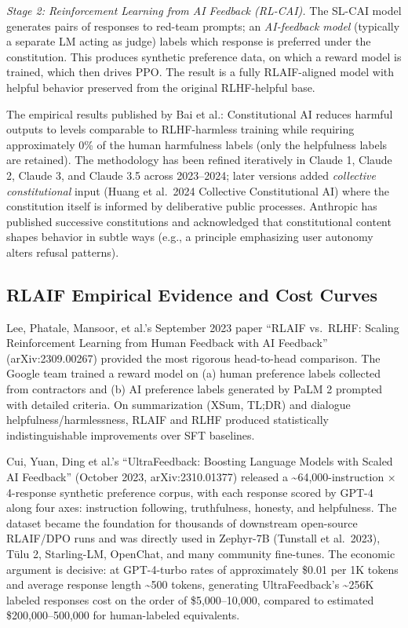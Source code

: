 \documentclass{article}
\begin{document}
\emph{Stage 2: Reinforcement Learning from AI Feedback (RL-CAI).} The SL-CAI model generates pairs of responses to red-team prompts; an \emph{AI-feedback model} (typically a separate LM acting as judge) labels which response is preferred under the constitution. This produces synthetic preference data, on which a reward model is trained, which then drives PPO. The result is a fully RLAIF-aligned model with helpful behavior preserved from the original RLHF-helpful base.

The empirical results published by Bai et al.: Constitutional AI reduces harmful outputs to levels comparable to RLHF-harmless training while requiring approximately 0\% of the human harmfulness labels (only the helpfulness labels are retained). The methodology has been refined iteratively in Claude 1, Claude 2, Claude 3, and Claude 3.5 across 2023--2024; later versions added \emph{collective constitutional} input (Huang et al.~2024 Collective Constitutional AI) where the constitution itself is informed by deliberative public processes. Anthropic has published successive constitutions and acknowledged that constitutional content shapes behavior in subtle ways (e.g., a principle emphasizing user autonomy alters refusal patterns).

\subsection{RLAIF Empirical Evidence and Cost Curves}\label{rlaif-empirical-evidence-and-cost-curves}

Lee, Phatale, Mansoor, et al.'s September 2023 paper ``RLAIF vs.~RLHF: Scaling Reinforcement Learning from Human Feedback with AI Feedback'' (arXiv:2309.00267) provided the most rigorous head-to-head comparison. The Google team trained a reward model on (a) human preference labels collected from contractors and (b) AI preference labels generated by PaLM 2 prompted with detailed criteria. On summarization (XSum, TL;DR) and dialogue helpfulness/harmlessness, RLAIF and RLHF produced statistically indistinguishable improvements over SFT baselines.

Cui, Yuan, Ding et al.'s ``UltraFeedback: Boosting Language Models with Scaled AI Feedback'' (October 2023, arXiv:2310.01377) released a \textasciitilde64,000-instruction × 4-response synthetic preference corpus, with each response scored by GPT-4 along four axes: instruction following, truthfulness, honesty, and helpfulness. The dataset became the foundation for thousands of downstream open-source RLAIF/DPO runs and was directly used in Zephyr-7B (Tunstall et al.~2023), Tülu 2, Starling-LM, OpenChat, and many community fine-tunes. The economic argument is decisive: at GPT-4-turbo rates of approximately \$0.01 per 1K tokens and average response length \textasciitilde500 tokens, generating UltraFeedback's \textasciitilde256K labeled responses cost on the order of \$5,000--10,000, compared to estimated \$200,000--500,000 for human-labeled equivalents.
\end{document}
